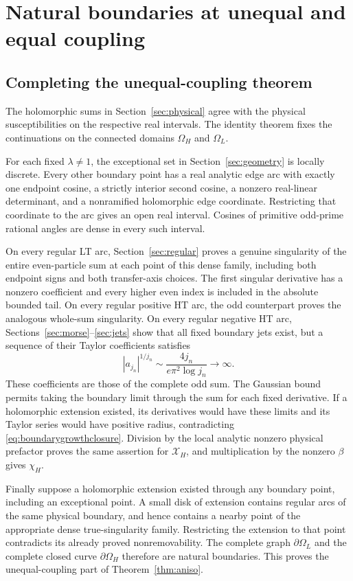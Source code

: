 \documentclass[11pt]{article}
\numberwithin{equation}{section}
\theoremstyle{definition}
\newcommand{\OH}{\Omega_H}
\newcommand{\OL}{\Omega_L}
\newcommand{\XH}{\mathcal X_H}
\begin{document}
\section{Natural boundaries at unequal and equal coupling}\label{sec:closure}

\subsection{Completing the unequal-coupling theorem}
The holomorphic sums in Section~\ref{sec:physical} agree with the
physical susceptibilities on the respective real intervals. The
identity theorem fixes the continuations on the connected domains
$\OH$ and $\OL$.

For each fixed $\lambda\ne1$, the exceptional set in
Section~\ref{sec:geometry} is locally discrete. Every other boundary
point has a real analytic edge arc with exactly one endpoint cosine,
a strictly interior second cosine, a nonzero real-linear determinant,
and a nonramified holomorphic edge coordinate. Restricting that
coordinate to the arc gives an open real interval. Cosines of primitive
odd-prime rational angles are dense in every such interval.

On every regular LT arc, Section~\ref{sec:regular} proves a genuine
singularity of the entire even-particle sum at each point of this dense
family, including both endpoint signs and both transfer-axis choices.
The first singular derivative has a nonzero coefficient and every
higher even index is included in the absolute bounded tail. On every
regular positive HT arc, the odd counterpart proves the analogous
whole-sum singularity. On every regular negative HT arc,
Sections~\ref{sec:morse}--\ref{sec:jets} show that all fixed boundary
jets exist, but a sequence of their Taylor coefficients satisfies
\begin{equation}\label{eq:boundarygrowthclosure}
 |a_{j_n}|^{1/j_n}\sim\frac{4j_n}{e\pi^2\log j_n}\longrightarrow\infty.
\end{equation}
These coefficients are those of the complete odd sum. The Gaussian
bound permits taking the boundary limit through the sum for each fixed
derivative. If a holomorphic extension existed, its derivatives would
have these limits and its Taylor series would have positive radius,
contradicting \eqref{eq:boundarygrowthclosure}. Division by the local
analytic nonzero physical prefactor proves the same assertion for
$\XH$, and multiplication by the nonzero $\beta$ gives $\chi_H$.

Finally suppose a holomorphic extension existed through any boundary
point, including an exceptional point. A small disk of extension contains
regular arcs of the same physical boundary, and hence contains a nearby
point of the appropriate dense true-singularity family. Restricting the
extension to that point contradicts its already proved nonremovability.
The complete graph $\partial\OL$ and the complete closed curve
$\partial\OH$ therefore are natural boundaries. This proves
the unequal-coupling part of Theorem~\ref{thm:aniso}.
\end{document}
